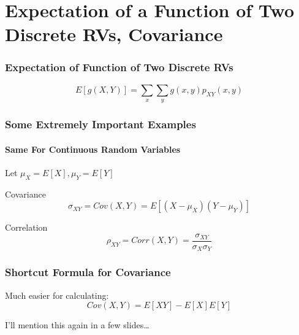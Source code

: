 \section{Expectation of a Function of Two Discrete RVs, Covariance}
\begin{frame}
\frametitle{Expectation of Function of Two Discrete RVs}
\Large
		$$\boxed{E[g(X,Y)] = \sum_x\sum_y g(x,y)p_{XY}(x,y)}$$
\end{frame}
\begin{frame}
\frametitle{Some Extremely Important Examples}
\framesubtitle{Same For Continuous Random Variables}
Let $\mu_X = E[X], \mu_Y = E[Y]$
\vspace{2em}

\begin{block}{Covariance}
$$\sigma_{XY} = Cov(X,Y) = E[(X-\mu_X)(Y - \mu_Y)]$$
\end{block}

\begin{block}{Correlation}
$$\rho_{XY} = Corr(X,Y) = \frac{\sigma_{XY}}{\sigma_X \sigma_Y}$$
\end{block}
\vspace{3em}
\end{frame}
\begin{frame}
\frametitle{Shortcut Formula for Covariance}

Much easier for calculating:
 $$\boxed{Cov(X,Y) = E[XY] - E[X]E[Y]}$$


\vspace{2em}
I'll mention this again in a few slides\dots
\end{frame}
